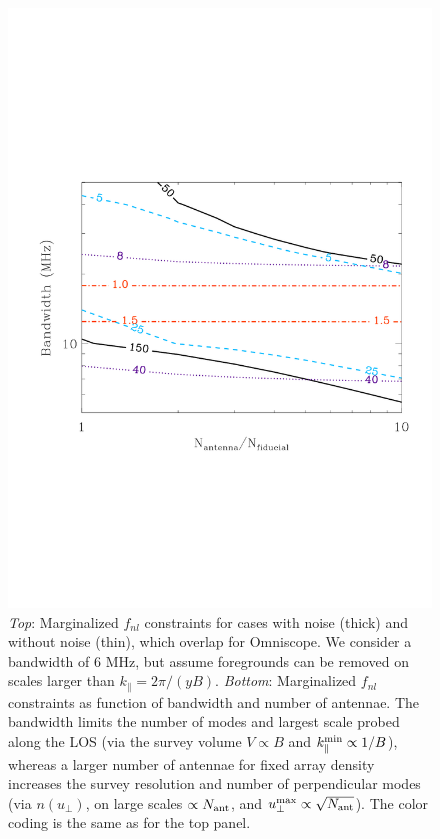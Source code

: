 \documentclass{PoS}
\newcommand{\fnl}{f_{nl}}
\begin{document}
\begin{figure}[!t]
\includegraphics[scale=0.3]{figures/figure5.pdf}
\caption{{\it Top}: Marginalized $\fnl$ constraints for cases with noise (thick) and without noise (thin), which overlap for Omniscope. We consider a bandwidth of 6 MHz, but assume foregrounds can be removed on scales larger than $k_\parallel = 2\pi/(yB)$. 
{\it Bottom}: Marginalized $\fnl$ constraints as function of bandwidth and number of antennae.
The bandwidth limits the number of modes and largest scale probed along the LOS (via the survey volume $V \propto B$ and $k_\parallel^{\rm min} \propto 1/B$), whereas a larger number of antennae for fixed array density increases the survey resolution and number of perpendicular modes (via $n(u_\perp)$, on large scales $\propto N_{\rm ant}$, and $u_\perp^{\rm max} \propto \sqrt{N_{\rm ant}}$).
The color coding is the same as for the top panel.}
\label{fnl}
\end{figure}
\end{document}
